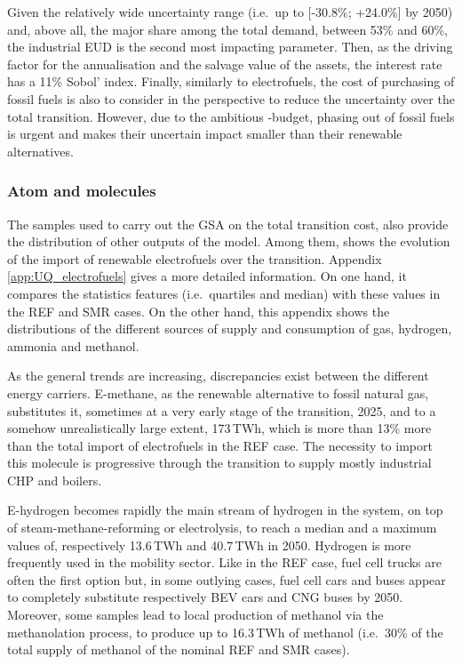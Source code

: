 \documentclass[11pt,twoside,a4paper,english]{article}
\def\ie{i.e.\ }
\begin{document}
Given the relatively wide uncertainty range (\ie up to [-30.8\%; +24.0\%] by 2050) and, above all, the major share among the total demand, between 53\% and 60\%, the industrial \gls{EUD} is the second most impacting parameter. Then, as the driving factor for the annualisation and the salvage value of the assets, the interest rate has a 11\% Sobol' index. Finally, similarly to electrofuels, the cost of purchasing of fossil fuels is also to consider in the perspective to reduce the uncertainty over the total transition. However, due to the ambitious -budget, phasing out of fossil fuels is urgent and makes their uncertain impact smaller than their renewable alternatives.

\subsubsection{Atom and molecules}
The samples used to carry out the \gls{GSA} on the total transition cost, also provide the distribution of other outputs of the model. Among them,  shows the evolution of the import of renewable electrofuels over the transition. Appendix \ref{app:UQ_electrofuels} gives a more detailed information. On one hand, it compares the statistics features (\ie quartiles and median) with these values in the REF and SMR cases. On the other hand, this appendix shows the distributions of the different sources of supply and consumption of gas, hydrogen, ammonia and methanol.

As the general trends are increasing, discrepancies exist between the different energy carriers. E-methane, as the renewable alternative to fossil natural gas, substitutes it, sometimes at a very early stage of the transition, 2025, and to a somehow unrealistically large extent, 173\,TWh, which is more than 13\% more than the total import of electrofuels in the REF case. The necessity to import this molecule is progressive through the transition to supply mostly industrial \gls{CHP} and boilers. 

E-hydrogen becomes rapidly the main stream of hydrogen in the system, on top of steam-methane-reforming or electrolysis, to reach a median and a maximum values of, respectively 13.6\,TWh and 40.7\,TWh in 2050. Hydrogen is more frequently used in the mobility sector. Like in the REF case, fuel cell trucks are often the first option but, in some outlying cases, fuel cell cars and buses appear to completely substitute respectively \gls{BEV} cars and \gls{CNG} buses by 2050. Moreover, some samples lead to local production of methanol via the methanolation process, to produce up to 16.3\,TWh of methanol (\ie 30\% of the total supply of methanol of the nominal REF and SMR cases). 
\end{document}
